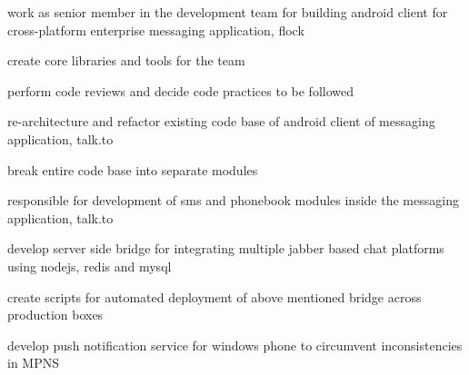 \begin{minipage}[t]{0.66\textwidth}
\sectionspace %


\begin{tightitemize}
\item work as senior member in the development team for building android client for cross-platform enterprise messaging application, flock
\item create core libraries and tools for the team
\item perform code reviews and decide code practices to be followed
\end{tightitemize}

\sectionspace %


\begin{tightitemize}
\item re-architecture and refactor existing code base of android client of messaging application, talk.to
\item break entire code base into separate modules
\item responsible for development of sms and phonebook modules inside the messaging application, talk.to
\end{tightitemize}

\sectionspace %


\begin{tightitemize}
\item develop server side bridge for integrating multiple jabber based chat platforms using nodejs, redis and mysql
\item create scripts for automated deployment of above mentioned bridge across production boxes
\item develop push notification service for windows phone to circumvent inconsistencies in MPNS
\end{tightitemize}

\sectionspace %



\end{minipage}

